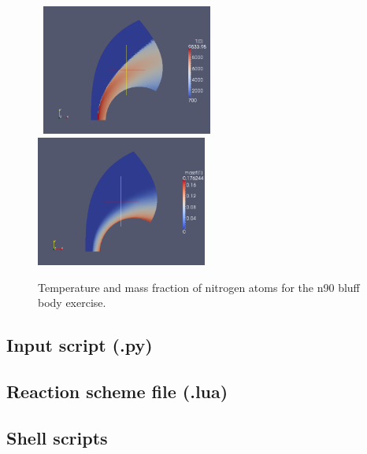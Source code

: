 \begin{figure}[htbp]
\begin{center}
\mbox{
\includegraphics[width=0.5\textwidth]{../2D/n90/n90-temperature.png}
\includegraphics[width=0.5\textwidth]{../2D/n90/n90-massf1.png}
}
\end{center}
\caption{Temperature and mass fraction of nitrogen atoms for the n90 bluff body exercise.}
\label{n90-temperature-massf-fig}
\end{figure}

\newpage

\subsection{Input script (.py)}
\topbar

\bottombar

\subsection{Reaction scheme file (.lua)}
\topbar

\bottombar

\subsection{Shell scripts}
\label{n90-sh-files}
\topbar

\bottombar

